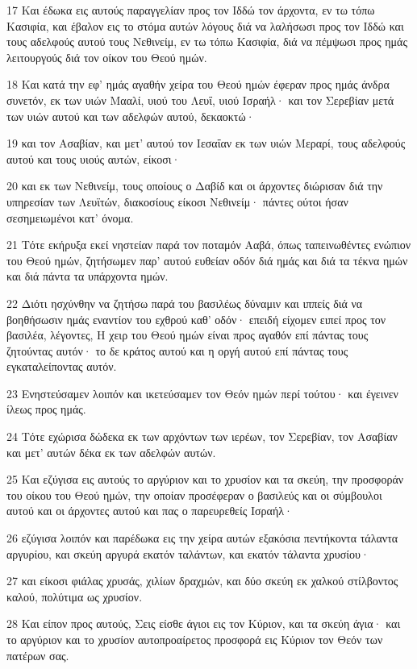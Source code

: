 \par 17 Και έδωκα εις αυτούς παραγγελίαν προς τον Ιδδώ τον άρχοντα, εν τω τόπω Κασιφία, και έβαλον εις το στόμα αυτών λόγους διά να λαλήσωσι προς τον Ιδδώ και τους αδελφούς αυτού τους Νεθινείμ, εν τω τόπω Κασιφία, διά να πέμψωσι προς ημάς λειτουργούς διά τον οίκον του Θεού ημών.
\par 18 Και κατά την εφ' ημάς αγαθήν χείρα του Θεού ημών έφεραν προς ημάς άνδρα συνετόν, εκ των υιών Μααλί, υιού του Λευΐ, υιού Ισραήλ· και τον Σερεβίαν μετά των υιών αυτού και των αδελφών αυτού, δεκαοκτώ·
\par 19 και τον Ασαβίαν, και μετ' αυτού τον Ιεσαΐαν εκ των υιών Μεραρί, τους αδελφούς αυτού και τους υιούς αυτών, είκοσι·
\par 20 και εκ των Νεθινείμ, τους οποίους ο Δαβίδ και οι άρχοντες διώρισαν διά την υπηρεσίαν των Λευϊτών, διακοσίους είκοσι Νεθινείμ· πάντες ούτοι ήσαν σεσημειωμένοι κατ' όνομα.
\par 21 Τότε εκήρυξα εκεί νηστείαν παρά τον ποταμόν Ααβά, όπως ταπεινωθέντες ενώπιον του Θεού ημών, ζητήσωμεν παρ' αυτού ευθείαν οδόν διά ημάς και διά τα τέκνα ημών και διά πάντα τα υπάρχοντα ημών.
\par 22 Διότι ησχύνθην να ζητήσω παρά του βασιλέως δύναμιν και ιππείς διά να βοηθήσωσιν ημάς εναντίον του εχθρού καθ' οδόν· επειδή είχομεν ειπεί προς τον βασιλέα, λέγοντες, Η χειρ του Θεού ημών είναι προς αγαθόν επί πάντας τους ζητούντας αυτόν· το δε κράτος αυτού και η οργή αυτού επί πάντας τους εγκαταλείποντας αυτόν.
\par 23 Ενηστεύσαμεν λοιπόν και ικετεύσαμεν τον Θεόν ημών περί τούτου· και έγεινεν ίλεως προς ημάς.
\par 24 Τότε εχώρισα δώδεκα εκ των αρχόντων των ιερέων, τον Σερεβίαν, τον Ασαβίαν και μετ' αυτών δέκα εκ των αδελφών αυτών.
\par 25 Και εζύγισα εις αυτούς το αργύριον και το χρυσίον και τα σκεύη, την προσφοράν του οίκου του Θεού ημών, την οποίαν προσέφεραν ο βασιλεύς και οι σύμβουλοι αυτού και οι άρχοντες αυτού και πας ο παρευρεθείς Ισραήλ·
\par 26 εζύγισα λοιπόν και παρέδωκα εις την χείρα αυτών εξακόσια πεντήκοντα τάλαντα αργυρίου, και σκεύη αργυρά εκατόν ταλάντων, και εκατόν τάλαντα χρυσίου·
\par 27 και είκοσι φιάλας χρυσάς, χιλίων δραχμών, και δύο σκεύη εκ χαλκού στίλβοντος καλού, πολύτιμα ως χρυσίον.
\par 28 Και είπον προς αυτούς, Σεις είσθε άγιοι εις τον Κύριον, και τα σκεύη άγια· και το αργύριον και το χρυσίον αυτοπροαίρετος προσφορά εις Κύριον τον Θεόν των πατέρων σας.
